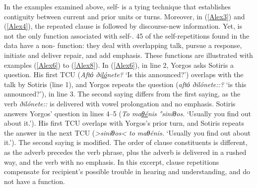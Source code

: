 \documentclass[output=paper]{LSP/langsci}
\begin{document}
In the examples examined above, self- is a tying technique that establishes contiguity between current and prior units or turns. Moreover, in (\ref{Alex3}) and (\ref{Alex4}), the repeated clause is followed by discourse-new information. Yet,  is not the only function associated with self-. 45 of the self-repetitions found in the data have a non- function: they deal with overlapping talk, pursue a response, initiate and deliver repair, and add emphasis. These functions are illustrated with examples (\ref{Alex6}) to (\ref{Alex8}). In (\ref{Alex6}), in line 2, Yorgos asks Sotiris a question. His first TCU (\textit{Αftό ði\underline{ló}nete?} `Is this announced?') overlaps with the talk by Sotiris (line 1), and Yorgos repeats the question (\textit{aftό ðilónete::?} `is this announced?'), in line 3. The second saying differs from the first saying, as the verb \textit{ðilónete::} is delivered with vowel prolongation and no emphasis. Sotiris answers Yorgos’ question in lines 4--5 (\textit{To ma\underline{θé}nis °siníθos}. `Usually you find out about it.'). His first TCU overlaps with Yorgos’s prior turn, and Sotiris repeats the answer in the next TCU (\textit{>siníθos< to maθénis.} `Usually you find out about it.'). The second saying is modified. The order of clause constituents is different, as the adverb precedes the verb phrase, plus the adverb is delivered in a rushed way, and the verb with no emphasis. In this excerpt, clause repetitions compensate for recipient’s possible trouble in hearing and understanding, and do not have a  function. 
\pagebreak
\end{document}

